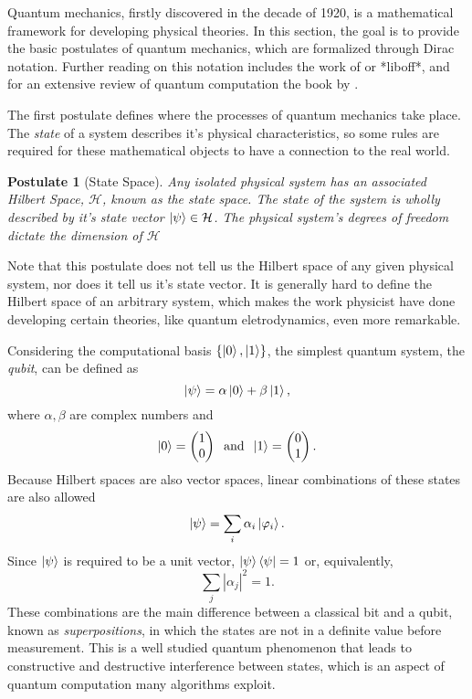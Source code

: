\documentclass[../../../dissertation.tex]{subfiles}
\newtheorem{post}{Postulate}
\begin{document}
Quantum mechanics, firstly discovered in the decade of 1920, is a mathematical
framework for developing physical theories. In this section, the goal is to
provide the basic postulates of quantum mechanics, which are formalized through
Dirac notation. Further reading on this notation includes the work of
\cite{sakurai1994} or *liboff*, and for an extensive review of quantum computation the
book by \cite{nielsen2011}.\par  
The first postulate defines where the processes of quantum mechanics take
place. The \textit{state} of a system describes it's physical characteristics,
so some rules are required for these mathematical objects to have a connection
to the real world.
\begin{post}[State Space] 
	Any isolated physical system has an associated Hilbert Space,
	$\mathcal{H}$, known as the state space. The state of the system is
	wholly described by it's state vector $\ket{\psi} \in \mathcal{H}$. The
	physical system's degrees of freedom dictate the dimension of
	$\mathcal{H}$\par
\end{post}
Note that this postulate does not tell us the Hilbert space of any given
physical system, nor does it tell us it's state vector. It is generally hard to
define the Hilbert space of an arbitrary system, which makes the work physicist
have done developing certain theories, like quantum eletrodynamics, even more
remarkable.\par 
Considering the computational basis $\{\ket{0},\ket{1}\}$, the simplest quantum
system, the \textit{qubit}, can be defined as 
\begin{equation}
	\ket{\psi} = \alpha \ket{0} + \beta \ket{1},
\end{equation}
where $\alpha,\beta$ are complex numbers and
\begin{equation}
	\ket{0} = \begin{pmatrix} 1 \\0 \end{pmatrix}  \; \; \text{and}  \;  \;  \ket{1} = \begin{pmatrix} 0 \\1 \end{pmatrix}.
\end{equation}
Because Hilbert spaces are also vector spaces, linear combinations of these
states are also allowed 
\begin{equation}
	\ket{\psi} = \sum_i \alpha_i \ket{\varphi_i}.
\end{equation}
Since $\ket{\psi}$ is required to be a unit vector, $\ket{\psi}\bra{\psi}=1$ or, equivalently,
\begin{equation}
	\sum_j | \alpha_j |^2 = 1 .
\end{equation}
These combinations are the main difference between a classical bit and a qubit,
known as \textit{superpositions}, in which the states are not in a definite
value before measurement. This is a well studied quantum phenomenon that leads
to constructive and destructive interference between states, which is an aspect
of quantum computation many algorithms exploit.\par
\end{document}

